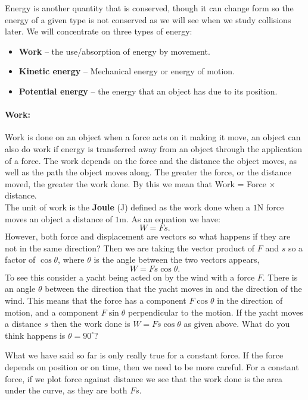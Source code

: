 \documentclass[a4paper,12pt]{book}
\begin{document}
Energy is another quantity that is conserved, though it can change form so the energy of a given type is not conserved as we will see when we study collisions later. We will concentrate on three types of energy:
\begin{itemize}
\setlength{\itemsep}{-5pt}
    \item \textbf{Work} -- the use/absorption of energy by movement.
    \item \textbf{Kinetic energy} -- Mechanical energy or energy of motion.
    \item \textbf{Potential energy} -- the energy that an object has due to its position.
\end{itemize} 

\paragraph{Work:} Work is done on an object when a force acts on it making it move, an object can also do work if energy is transferred away from an object through the application of a force. The work depends on the force and the distance the object moves, as well as the path the object moves along. The greater the force, or the distance moved, the greater the work done. By this we mean that Work = Force $\times$ distance. \\

The unit of work is the \textbf{Joule} (J) defined as the work done when a $1$N force moves an object a distance of $1$m. As an equation we have:
\begin{equation*}
W=Fs.
\end{equation*}
However, both force and displacement are vectors so what happens if they are not in the same direction? Then we are taking the vector product of $F$ and $s$ so a factor of $\cos\theta$, where $\theta$ is the angle between the two vectors appears,
\begin{equation*}
W=Fs\cos\theta.
\end{equation*}
To see this consider a yacht being acted on by the wind with a force $F$. There is an angle $\theta$ between the direction that the yacht moves in and the direction of the wind. This means that the force has a component $F\cos\theta$ in the direction of motion, and a component $F\sin\theta$ perpendicular to the motion. If the yacht moves a distance $s$ then the work done is $W=Fs\cos\theta$ as given above.  What do you think happens is $\theta=90^{\circ}$?

What we have said so far is only really true for a constant force. If the force depends on position or on time, then we need to be more careful. For a constant force, if we plot force against distance we see that the work done is the area under the curve, as they are both $Fs$.\\
\end{document}
